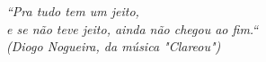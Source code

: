 \begin{epigrafe}
    \vspace*{\fill}
	\begin{flushright}
		\textit{``Pra tudo tem um jeito, \\
		e se não teve jeito, ainda não chegou ao fim.`` \\
		\emph{(Diogo Nogueira, da música "Clareou")}}\\
	\end{flushright}
\end{epigrafe}
